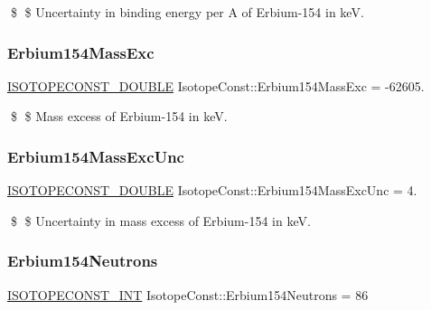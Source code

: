 \$ \$ Uncertainty in binding energy per A of Erbium-\/154 in keV. \mbox{\label{group___isotope_const-_erbium-_er154_ga5a1fa4340e2efb67f464f835e1499974}} 
\subsubsection{\texorpdfstring{Erbium154\+Mass\+Exc}{Erbium154MassExc}}
{\footnotesize\ttfamily \mbox{\hyperlink{group___isotope_const-_macros_ga8f45a7272ce02c0b4c65c44636ed719a}{I\+S\+O\+T\+O\+P\+E\+C\+O\+N\+S\+T\+\_\+\+D\+O\+U\+B\+LE}} Isotope\+Const\+::\+Erbium154\+Mass\+Exc = -\/62605.}

\$ \$ Mass excess of Erbium-\/154 in keV. \mbox{\label{group___isotope_const-_erbium-_er154_ga8270ed78c34bcd41da03340b35f35fee}} 
\subsubsection{\texorpdfstring{Erbium154\+Mass\+Exc\+Unc}{Erbium154MassExcUnc}}
{\footnotesize\ttfamily \mbox{\hyperlink{group___isotope_const-_macros_ga8f45a7272ce02c0b4c65c44636ed719a}{I\+S\+O\+T\+O\+P\+E\+C\+O\+N\+S\+T\+\_\+\+D\+O\+U\+B\+LE}} Isotope\+Const\+::\+Erbium154\+Mass\+Exc\+Unc = 4.}

\$ \$ Uncertainty in mass excess of Erbium-\/154 in keV. \mbox{\label{group___isotope_const-_erbium-_er154_gac4b090c907fb0c58a1348b5fd37ca2f2}} 
\subsubsection{\texorpdfstring{Erbium154\+Neutrons}{Erbium154Neutrons}}
{\footnotesize\ttfamily \mbox{\hyperlink{group___isotope_const-_macros_ga5f18360b3e99483a35c32d789e62621c}{I\+S\+O\+T\+O\+P\+E\+C\+O\+N\+S\+T\+\_\+\+I\+NT}} Isotope\+Const\+::\+Erbium154\+Neutrons = 86}

